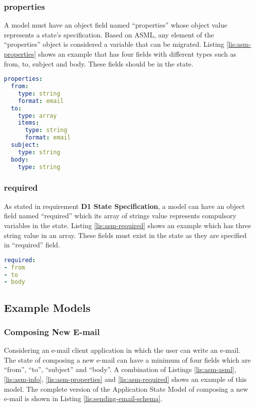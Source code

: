 \subsubsection{properties}
A model must have an object field named “properties” whose object value represents a state’s specification. Based on ASML, any element of the “properties” object is considered a variable that can be migrated.
Listing \ref{lis:asm-properties} shows an example that has four fields with different types such as from, to, subject and body. These fields should be in the state.

\lstset{
  label=lis:asm-properties, caption=Application State Model “properties” field example.
}
\begin{lstlisting}[language=yaml]
properties:
  from:
    type: string
    format: email
  to:
    type: array
    items:
      type: string
      format: email
  subject:
    type: string
  body:
    type: string

\end{lstlisting}
\subsubsection{required}
As stated in requirement \textbf{D1 State Specification}, a model can have an object field named “required” which its array of strings value represents compulsory variables in the state.
Listing \ref{lis:asm-required} shows an example which has three string value in an array. These fields must exist in the state as they are specified in “required” field.

\lstset{
  label=lis:asm-required, caption=Application State Model “required” field example.
}
\begin{lstlisting}[language=yaml]
required:
- from
- to
- body

\end{lstlisting}

\subsection{Example Models}
\subsubsection{Composing New E-mail}
Considering an e-mail client application in which the user can write an e-mail. The state of composing a new e-mail can have a minimum of four fields which are “from”, “to”, “subject” and “body”. A combination of Listings \ref{lis:asm-asml},  \ref{lis:asm-info},  \ref{lis:asm-properties} and  \ref{lis:asm-required} shows an example of this model.
The complete version of the Application State Model of composing a new e-mail is shown in Listing \ref{lis:sending-email-schema}.
